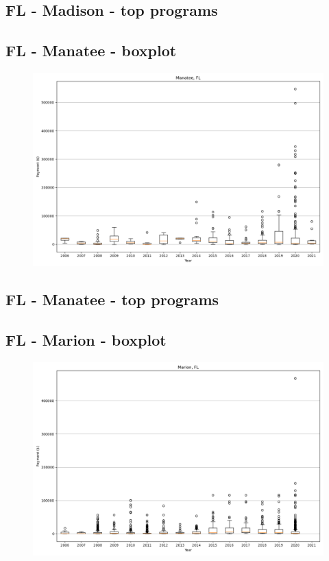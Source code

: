 \subsection*{FL - Madison - top programs}

\newpage
\subsection*{FL - Manatee - boxplot}
\begin{figure}[h]
\centering
\includegraphics[width=7in]{../output/boxplots/counties/Manatee-FL_boxplot.png}
\end{figure}


\subsection*{FL - Manatee - top programs}

\newpage
\subsection*{FL - Marion - boxplot}
\begin{figure}[h]
\centering
\includegraphics[width=7in]{../output/boxplots/counties/Marion-FL_boxplot.png}
\end{figure}


